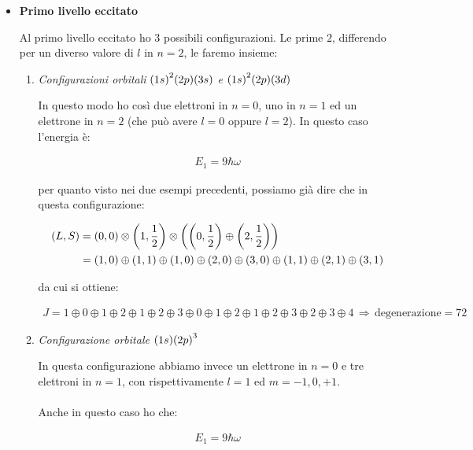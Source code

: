 \begin{itemize}
		con degenerazione $15$.

	\item \textbf{Primo livello eccitato}
	
		Al primo livello eccitato ho $3$ possibili configurazioni. Le prime $2$, differendo per un diverso valore di $l$ in $n = 2$, le faremo insieme:
		
	\begin{enumerate}
		\item \textit{Configurazioni orbitali} $\qty(1s)^2\qty(2p)\qty(3s)$ \textit{e} $\qty(1s)^2\qty(2p)\qty(3d)$
			
			In questo modo ho così due elettroni in $n = 0$, uno in $n  =1$ ed un elettrone in $n = 2$ (che può avere $l = 0$ oppure $l = 2$). In questo caso l'energia è:
			
		\begin{align*}
			E_1 = 9 \hbar \omega
		\end{align*}
		
			per quanto visto nei due esempi precedenti, possiamo già dire che in questa configurazione:
			
		\begin{align*}
			\qty(L, S) & = \qty(0, 0) \otimes \qty(1, \frac{1}{2}) \otimes \qty(\qty(0, \frac{1}{2}) \oplus \qty(2, \frac{1}{2}) ) \\
			& = \qty(1, 0) \oplus \qty(1, 1) \oplus \qty(1, 0) \oplus \qty(2, 0) \oplus \qty(3, 0) \oplus \qty(1, 1) \oplus \qty(2, 1) \oplus \qty(3, 1)
		\end{align*}
		
			da cui si ottiene:
			
		\begin{align*}
			J = 1 \oplus 0 \oplus 1 \oplus 2 \oplus 1 \oplus 2 \oplus 3 \oplus 0 \oplus 1 \oplus 2 \oplus 1 \oplus 2 \oplus 3 \oplus 2 \oplus 3 \oplus 4 \, \Rightarrow \, \text{degenerazione} = 72
		\end{align*}
	
		\item \textit{Configurazione orbitale} $\qty(1s)\qty(2p)^3$
		
			In questa configurazione abbiamo invece un elettrone in $n = 0$ e tre elettroni in $n = 1$, con rispettivamente $ l =1$ ed $m = -1, 0, +1$. 
			\\
			\\
			Anche in questo caso ho che:
			
		\begin{align*}
			E_1 = 9 \hbar \omega
		\end{align*}


\end{enumerate}
\end{itemize}
